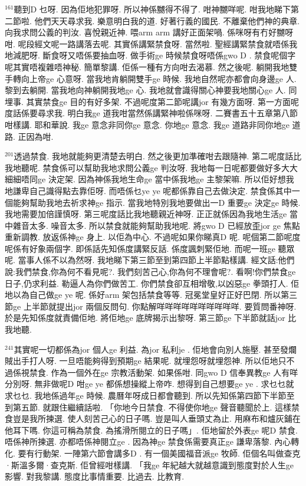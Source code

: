 \documentclass{book}
\begin{document}
$^{161}$聽到D 乜呀.
因為佢地犯罪呀.
所以神係嬲得不得了.
咁神嬲咩呢.
咁我地睇下第二節啦.
他們天天尋求我.
樂意明白我的道.
好著行義的國民.
不離棄他們神的典章.
向我求問公義的判汝.
喜悅親近神.
喂arm arm 講好正面架喎.
係咪呀有冇好嬲呀咁.
呢段經文呢一路講落去呢.
其實係講緊禁食呀.
當然啦.
聖經講緊禁食就唔係我地減肥呀.
斷食呀又唔係要抽血呀.
做手術ge 時候禁食呀唔係gwo D .
禁食呢個字呢其實唔複雜唔神秘.
簡單黎講.
佢係一種有方向咁去渴慕.
然之後呢.
躺開我地雙手轉向上帝ge 心意呀.
當我地肯躺開雙手ge 時候.
我地自然呢亦都會向身邊ge 人.
黎到去躺開.
當我地向神躺開我地ge 心.
我地就會識得關心神要我地關心ge 人.
同埋事.
其實禁食ge 目的有好多架.
不過呢度第二節呢講jor 有幾方面呀.
第一方面呢度話係要尋求我.
明白我ge 道我咁當然係講緊神啦係咪呀.
二賽書五十五章第八節咁樣講.
耶和華說.
我ge 意念非同你ge 意念.
你地ge 意念.
我ge 道路非同你地ge 道路.
正因為咁.

$^{201}$透過禁食.
我地就能夠更清楚去明白.
然之後更加準確咁去跟隨神.
第二呢度話比我地聽呢.
禁食係可以幫助我地求問公義ge 判汝呀.
我地每一日呢都要做好多大大細細唔同ge 決定架.
因為神係我地生命ge 當中係我地ge 主黎架嘛.
所以佢好想我地謙卑自己識得點去靠佢呀.
而唔係乜ye ye 呢都係靠自己去做決定.
禁食係其中一個能夠幫助我地去祈求神ge 指示.
當我地特別我地要做出一D 重要ge 決定ge 時候.
我地需要加倍謹慎呀.
第三呢度話比我地聽親近神呀.
正正就係因為我地生活ge 當中雜音太多.
噪音太多.
所以禁食就能夠幫助我地呢.
將gwo D 已經放歪jor ge 焦點重新調教.
放返係神ge 身上.
以佢為中心.
不過呢如果你睇真D 呢.
呢個第二節呢度呢係有好象兩個字.
即係話先知係度講緊反話.
係度諷刺緊佢地.
而呢一班ge 聽眾呢.
當事人係不以為然呀.
我地睇下第三節至到第四節上半節點樣講.
經文話:他們說:我們禁食,你為何不看見呢?.
我們刻苦己心,你為何不理會呢?.
看啊!你們禁食ge 日子,仍求利益.
勒逼人為你們做苦工.
你們禁食卻互相增敬,以凶惡ge 拳頭打人.
佢地以為自己做ge ye 呢.
係好arm 架包括禁食等等.
冠冕堂皇好正好巴閉.
所以第三節ge 上半節就提出jor 兩個反問句.
你點解咩咩咩咩咩咩咩咩咩咩.
要質問番神呀.
於是先知係度就責備佢地.
將佢地ge 底牌揭示出黎呀.
第三節ge 下半節就話jor 比我地聽.

$^{241}$其實呢一切都係為jor 個人ge 利益.
為jor 私利je .
佢地會向別人施壓.
甚至發爛賊出手打人呀.
一旦唔能夠得到預期ge 結果呢.
就埋怨呀就埋怨神.
所以佢地只不過係視禁食.
作為一個外在ge 宗教活動架.
如果係咁.
同gwo D 信奉異教ge 人有咩分別呀.
無非做呢D 咁ge ye 都係想操縱上帝咋.
想得到自己想要ge ye .
求乜乜就求乜乜.
我地係過年ge 時候.
農曆年呀成日都會聽到.
所以先知係第四節下半節至到第五節.
就跟住繼續話啦.
「你地今日禁食.
不得使你地ge 聲音聽聞於上.
這樣禁食豈是我所揀選.
使人刻苦己心的日子嗎.
豈是叫人垂頭丈為止.
用麻布和爐灰鋪在他耳下嗎.
你這可稱為禁食.
為搖滑所閱立的日子嗎」.
佢地留於外表ge 呢D 禁食.
唔係神所揀選.
亦都唔係神閱立ge .
因為神ge 禁食係需要真正ge 謙卑落黎.
內心轉化.
要有行動架.
一陣第六節會講多D .
有一個美國福音派ge 牧師.
佢個名叫做查克·斯溫多爾·查克斯.
佢曾經咁樣講.
「我ge 年紀越大就越意識到態度對於人生ge 影響.
對我黎講.
態度比事情重要.
比過去.
比教育.
\end{document}
